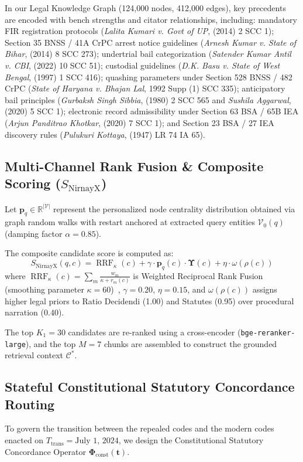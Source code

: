 \documentclass[conference]{IEEEtran}
\begin{document}
In our Legal Knowledge Graph (124,000 nodes, 412,000 edges), key precedents are encoded with bench strengths and citator relationships, including: mandatory FIR registration protocols (\textit{Lalita Kumari v. Govt of UP}, (2014) 2 SCC 1); Section 35 BNSS / 41A CrPC arrest notice guidelines (\textit{Arnesh Kumar v. State of Bihar}, (2014) 8 SCC 273); undertrial bail categorization (\textit{Satender Kumar Antil v. CBI}, (2022) 10 SCC 51); custodial guidelines (\textit{D.K. Basu v. State of West Bengal}, (1997) 1 SCC 416); quashing parameters under Section 528 BNSS / 482 CrPC (\textit{State of Haryana v. Bhajan Lal}, 1992 Supp (1) SCC 335); anticipatory bail principles (\textit{Gurbaksh Singh Sibbia}, (1980) 2 SCC 565 and \textit{Sushila Aggarwal}, (2020) 5 SCC 1); electronic record admissibility under Section 63 BSA / 65B IEA (\textit{Arjun Panditrao Khotkar}, (2020) 7 SCC 1); and Section 23 BSA / 27 IEA discovery rules (\textit{Pulukuri Kottaya}, (1947) LR 74 IA 65).

\subsection{Multi-Channel Rank Fusion \& Composite Scoring ($S_{\text{NirnayX}}$)}
Let $\mathbf{p}_q \in \mathbb{R}^{|\mathcal{V}|}$ represent the personalized node centrality distribution obtained via graph random walks with restart anchored at extracted query entities $\mathcal{V}_0(q)$ (damping factor $\alpha = 0.85$).

The composite candidate score is computed as:
\begin{equation}
S_{\text{NirnayX}}(q, c) = \operatorname{RRF}_{\kappa}(c) + \gamma \cdot \mathbf{p}_q(c) \cdot \mathbf{\Upsilon}(c) + \eta \cdot \omega(\rho(c))
\end{equation}
where $\operatorname{RRF}_{\kappa}(c) = \sum_{m} \frac{w_m}{\kappa + r_m(c)}$ is Weighted Reciprocal Rank Fusion (smoothing parameter $\kappa = 60$)~\cite{cormack2009reciprocal}, $\gamma = 0.20$, $\eta = 0.15$, and $\omega(\rho(c))$ assigns higher legal priors to Ratio Decidendi (1.00) and Statutes (0.95) over procedural narration (0.40).

The top $K_1 = 30$ candidates are re-ranked using a cross-encoder (\texttt{bge-reranker-large}), and the top $M = 7$ chunks are assembled to construct the grounded retrieval context $\mathcal{C}^*$.

\subsection{Stateful Constitutional Statutory Concordance Routing}
To govern the transition between the repealed codes and the modern codes enacted on $T_{\text{trans}} = \text{July 1, 2024}$, we design the Constitutional Statutory Concordance Operator $\mathbf{\Phi}_{\text{const}}(\mathbf{t})$.
\end{document}
